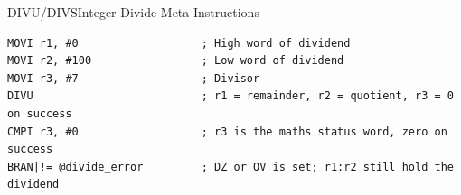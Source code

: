 \begin{instructionbox}{DIVU/DIVS}{Integer Divide Meta-Instructions}
	\begin{example}
		\begin{lstlisting}
MOVI r1, #0                   ; High word of dividend
MOVI r2, #100                 ; Low word of dividend
MOVI r3, #7                   ; Divisor
DIVU                          ; r1 = remainder, r2 = quotient, r3 = 0 on success
CMPI r3, #0                   ; r3 is the maths status word, zero on success
BRAN|!= @divide_error         ; DZ or OV is set; r1:r2 still hold the dividend
		\end{lstlisting}
		\caption{Unsigned Divide with Error Check}
	\end{example}
\end{instructionbox}
